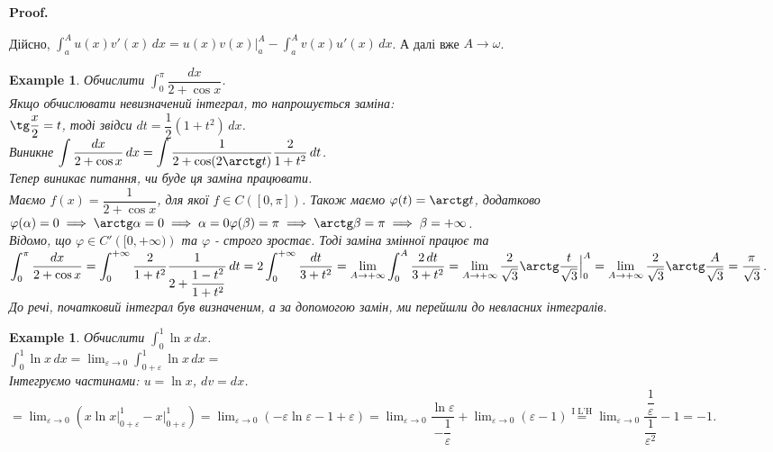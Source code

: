 \documentclass[a4paper, 10pt]{article}
\makeatletter
\def\huge{\displaystyle}
\def\qed{$\blacksquare$}
\theoremstyle{theoremdd}
\theoremstyle{theoremdd}
\theoremstyle{theoremdd}
\theoremstyle{theoremdd}
\theoremstyle{theoremdd}
\newtheorem{example}[theorem]{Example}
\theoremstyle{theoremdd}
\theoremstyle{theoremdd}
\theoremstyle{theoremdd}
\theoremstyle{theoremdd}
\renewenvironment{proof}[1][Proof.\\]{\par
\pushQED{\hfill \qed}%
\normalfont \topsep6\p@\@plus6\p@\relax
\trivlist
\item\relax
{\bfseries
#1\@addpunct{.}}\hspace\labelsep\ignorespaces
}{%
\popQED\endtrivlist\@endpefalse
}
\makeatother
\begin{document}
\begin{proof}
Дійсно, $\displaystyle\int_a^A u(x)v'(x)\,dx = u(x)v(x) \Big|_a^{A} - \int_a^A v(x)u'(x)\,dx$. А далі вже $A \to \omega$.
\end{proof}

\begin{example}
Обчислити $\huge\int_0^{\pi} \dfrac{dx}{2+\cos x}$.\\
Якщо обчислювати невизначений інтеграл, то напрошується заміна: \\
$\tg \dfrac{x}{2} = t$, тоді звідси $dt = \dfrac{1}{2} (1+t^2)\,dx$.\\
Виникне $\huge\int \dfrac{dx}{2+\cos x} \,dx = \int \dfrac{1}{2+\cos (2 \arctg t)} \dfrac{2}{1+t^2}\,dt$.\\
Тепер виникає питання, чи буде ця заміна працювати.\\
Маємо $f(x) = \dfrac{1}{2+\cos x}$, для якої $f \in C([0,\pi])$. Також маємо $\varphi(t) = \arctg t$, додатково \\
$\varphi(\alpha) = 0 \implies \arctg \alpha = 0 \implies \alpha = 0 \\
\varphi(\beta) = \pi \implies \arctg \beta = \pi \implies \beta = +\infty$.\\ 
Відомо, що $\varphi \in C'\left([0,+\infty)\right)$ та $\varphi$ - строго зростає. Тоді заміна змінної працює та\\
$\huge\int_0^\pi \dfrac{dx}{2+\cos x} = \int_0^{+\infty} \dfrac{2}{1+t^2} \dfrac{1}{2 + \dfrac{1-t^2}{1+t^2}}\,dt = 2 \int_0^{+\infty} \dfrac{dt}{3+t^2} = \lim_{A \to +\infty} \int_0^A \dfrac{2\,dt}{3+t^2} = \lim_{A \to +\infty} \dfrac{2}{\sqrt{3}} \arctg \dfrac{t}{\sqrt{3}} \Big|_0^A = \lim_{A \to +\infty} \dfrac{2}{\sqrt{3}} \arctg \dfrac{A}{\sqrt{3}} = \dfrac{\pi}{\sqrt{3}}$.\\
До речі, початковий інтеграл був визначеним, а за допомогою замін, ми перейшли до невласних інтегралів.
\end{example}

\begin{example} Обчислити $\huge\int_0^1 \ln x \,dx$.\\
$\huge\int_0^1 \ln x \,dx = \huge \lim_{\varepsilon \to 0} \int_{0+\varepsilon}^1 \ln x \,dx \boxed{=}$\\
Інтегруємо частинами: $u = \ln x$, $dv = dx$.\\
$\boxed{=} \huge\lim_{\varepsilon \to 0} \left(x \ln x \Big|_{0+\varepsilon}^1 - x \Big|_{0+\varepsilon}^1 \right) = \lim_{\varepsilon \to 0} \left( -\varepsilon \ln \varepsilon - 1 + \varepsilon \right) = \lim_{\varepsilon \to 0} \dfrac{\ln \varepsilon}{-\dfrac{1}{\varepsilon}} + \lim_{\varepsilon \to 0} (\varepsilon - 1) \overset{\text{I L'H}}{=} \lim_{\varepsilon \to 0} \dfrac{\dfrac{1}{\varepsilon}}{\dfrac{1}{\varepsilon^2}} - 1 = -1$.
\end{example}
\end{document}
